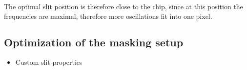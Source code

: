 The optimal slit position is therefore close to the chip, since at this position the frequencies are maximal, therefore more oscillations fit into one pixel.
\newpage
\subsection{Optimization of the masking setup}
\label{subsec:slit_optim}
\begin{itemize}
	\item Custom slit properties
\end{itemize}

